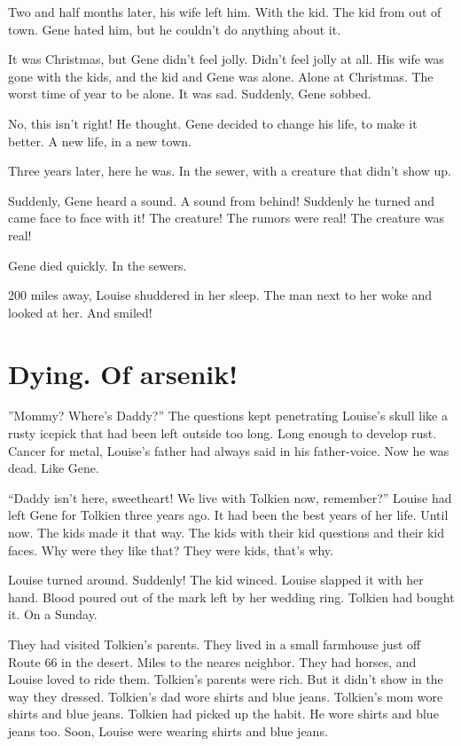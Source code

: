 Two and half months later, his wife left him. With the kid. The kid from
out of town. Gene hated him, but he couldn't do anything about it.

It was Christmas, but Gene didn't feel jolly. Didn't feel jolly at
all. His wife was gone with the kids, and the kid and Gene was
alone. Alone at Christmas. The worst time of year to be alone. It was
sad. Suddenly, Gene sobbed.

No, this isn't right! He thought. Gene decided to change his life, to
make it better. A new life, in a new town.

Three years later, here he was. In the sewer, with a creature that
didn't show up.

Suddenly, Gene heard a sound. A sound from behind! Suddenly he turned
and came face to face with it! The creature! The rumors were real! The
creature was real!

Gene died quickly. In the sewers.

200 miles away, Louise shuddered in her sleep. The man next to her woke
and looked at her. And smiled!

\section*{Dying. Of arsenik!}



''Mommy? Where's Daddy?'' The questions kept
penetrating Louise's skull like a rusty icepick that had been
left outside too long. Long enough to develop rust. Cancer for
metal, Louise's father had always said in his father-voice. Now he
was dead. Like Gene.



``Daddy isn't here, sweetheart! We live with Tolkien now, remember?''
Louise had left Gene for Tolkien three years ago. It had been the
best years of her life. Until now. The kids made it that way. The
kids with their kid questions and their kid faces. Why were they
like that? They were kids, that's why.



Louise turned around. Suddenly! The kid winced. Louise slapped it
with her hand. Blood poured out of the mark left by her wedding
ring. Tolkien had bought it. On a Sunday.



They had visited Tolkien's parents. They lived in a small farmhouse
just off Route 66 in the desert. Miles to the neares neighbor. They
had horses, and Louise loved to ride them. Tolkien's parents were
rich. But it didn't show in the way they dressed. Tolkien's dad
wore shirts and blue jeans. Tolkien's mom wore shirts and blue
jeans. Tolkien had picked up the habit. He wore shirts and blue
jeans too. Soon, Louise were wearing shirts and blue jeans.



